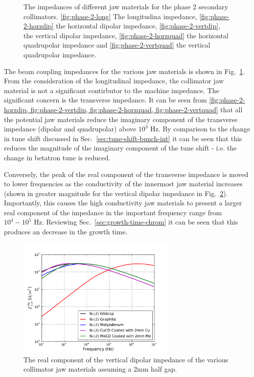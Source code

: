 \begin{figure}
{\label{fig:phase-2-vertquad}
}
\label{fig:phase-2-jaw-impedances}
\caption{The impedances of different jaw materials for the phase 2 secondary collimators. \ref{fig:phase-2-long} The longitudina impedance, \ref{fig:phase-2-horzdip} the horizontal dipolar impedance, \ref{fig:phase-2-vertdip}, the vertical dipolar impedance, \ref{fig:phase-2-horzquad} the horizontal quadrupolar impedance and \ref{fig:phase-2-vertquad} the vertical quadrupolar impedance.}
\end{figure}

The beam coupling impedances for the various jaw materials is shown in Fig.~\ref{fig:phase-2-jaw-impedances}. From the consideration of the longitudinal impedance, the collimator jaw material is not a significant contirbutor to the machine impedance. The significant concern is the transverse impedance. It can be seen from \cref{fig:phase-2-horzdip, fig:phase-2-vertdip, fig:phase-2-horzquad, fig:phase-2-vertquad} that all the potential jaw materials reduce the imaginary component of the transverse impedance (dipolar and quadrupolar) above $10^{3}$ Hz. By comparison to the change in tune shift discussed in Sec.~\ref{sec:tune-shift-bunch-int} it can be seen that this reduces the magnitude of the imaginary component of the tune shift - i.e. the change in betatron tune is reduced. 

Conversely, the peak of the real component of the transverse impedance is moved to lower frequencies as the conductivity of the innermost jaw material increases (shown in greater magnitude for the vertical dipolar impedance in Fig.~\ref{fig:phase-2-vertdip-zoom}). Importantly, this causes the high conductivity jaw materials to present a larger real component of the impedance in the important frequency range from $10^{4}-10^{5}$ Hz. Reviewing Sec.~\ref{sec:growth-time-chrom} it can be seen that this produces an decrease in the growth time. 

\begin{figure}
\begin{center}
\includegraphics[width=0.7\textwidth]{LHC_Collimation_Upgrades/figures/vertDipolarZoom.pdf}
\end{center}
\label{fig:phase-2-vertdip-zoom}
\caption{The real component of the vertical dipolar impedance of the various collimator jaw materials assuming a 2mm half gap.}
\end{figure}
